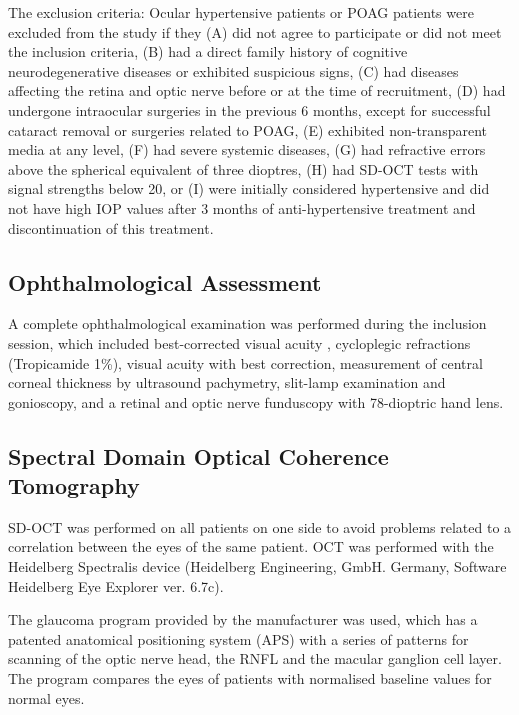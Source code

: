 \documentclass[jcm,article,submit,moreauthors,pdftex]{Definitions/mdpi}
\begin{document}
The exclusion criteria: Ocular hypertensive patients or POAG patients were excluded from the study if they (A) did not agree to participate or did not meet the inclusion criteria, (B) had a direct family history of cognitive neurodegenerative diseases or exhibited suspicious signs, (C) had diseases affecting the retina and optic nerve before or at the time of recruitment, (D) had undergone intraocular surgeries in the previous 6 months, except for successful cataract removal or surgeries related to POAG, (E) exhibited non-transparent media at any level, (F) had severe systemic diseases, (G) had refractive errors above the spherical equivalent of three dioptres, (H) had SD-OCT tests with signal strengths below 20, or (I) were initially considered hypertensive and did not have high IOP values after 3 months of anti-hypertensive treatment and discontinuation of this treatment.


\subsection{Ophthalmological Assessment}
A complete ophthalmological examination was performed during the inclusion session, which included best-corrected visual acuity , cycloplegic refractions (Tropicamide 1\%), visual acuity with best correction, measurement of central corneal thickness by ultrasound pachymetry, slit-lamp examination and gonioscopy, and a retinal and optic nerve funduscopy with 78-dioptric hand lens.


\subsection{Spectral Domain Optical Coherence Tomography}
SD-OCT was performed on all patients on one side to avoid problems related to a correlation between the eyes of the same patient. OCT was performed with the Heidelberg Spectralis device (Heidelberg Engineering, GmbH. Germany, Software Heidelberg Eye Explorer ver. 6.7c).

The glaucoma program provided by the manufacturer was used, which has a patented anatomical positioning system (APS) with a series of patterns for scanning of the optic nerve head, the RNFL and the macular ganglion cell layer. The program compares the eyes of patients with normalised baseline values for normal eyes.
\end{document}
